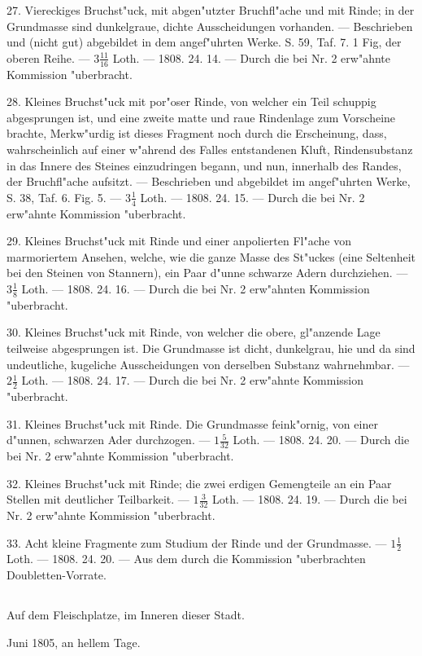 \documentclass[a4paper, 11pt, oneside, polutonikogreek, german]{article}
\begin{document}
27. Viereckiges Bruchst"uck, mit abgen"utzter Bruchfl"ache und mit Rinde; in der Grundmasse sind dunkelgraue, dichte Ausscheidungen vorhanden. --- Beschrieben und (nicht gut) abgebildet in dem angef"uhrten Werke. S. 59, Taf. 7. 1 Fig, der oberen Reihe. --- $\mathfrak{3\frac{11}{16}}$ Loth. --- 1808. 24. 14. --- Durch die bei Nr. 2 erw"ahnte Kommission "uberbracht.

28. Kleines Bruchst"uck mit por"oser Rinde, von welcher ein Teil schuppig abgesprungen ist, und eine zweite matte und raue Rindenlage zum Vorscheine brachte, Merkw"urdig ist dieses Fragment noch durch die Erscheinung, dass, wahrscheinlich auf einer w"ahrend des Falles entstandenen Kluft, Rindensubstanz in das Innere des Steines einzudringen begann, und nun, innerhalb des Randes, der Bruchfl"ache aufsitzt. --- Beschrieben und abgebildet im angef"uhrten Werke, S. 38, Taf. 6. Fig. 5. --- $\mathfrak{3\frac{1}{4}}$ Loth. --- 1808. 24. 15. --- Durch die bei Nr. 2 erw"ahnte Kommission "uberbracht.

29. Kleines Bruchst"uck mit Rinde und einer anpolierten Fl"ache von marmoriertem Ansehen, welche, wie die ganze Masse des St"uckes (eine Seltenheit bei den Steinen von Stannern), ein Paar d"unne schwarze Adern durchziehen. --- $\mathfrak{3\frac{1}{8}}$ Loth. --- 1808. 24. 16. --- Durch die bei Nr. 2 erw"ahnten Kommission "uberbracht.

30. Kleines Bruchst"uck mit Rinde, von welcher die obere, gl"anzende Lage teilweise abgesprungen ist. Die Grundmasse ist dicht, dunkelgrau, hie und da sind undeutliche, kugeliche Ausscheidungen von derselben Substanz wahrnehmbar. --- $\mathfrak{2\frac{1}{2}}$ Loth. --- 1808. 24. 17. --- Durch die bei Nr. 2 erw"ahnte Kommission "uberbracht.

31. Kleines Bruchst"uck mit Rinde. Die Grundmasse feink"ornig, von einer d"unnen, schwarzen Ader durchzogen. --- $\mathfrak{1\frac{5}{32}}$ Loth. --- 1808. 24. 20. --- Durch die bei Nr. 2 erw"ahnte Kommission "uberbracht.

32. Kleines Bruchst"uck mit Rinde; die zwei erdigen Gemengteile an ein Paar Stellen mit deutlicher Teilbarkeit. --- $\mathfrak{1\frac{3}{32}}$ Loth. --- 1808. 24. 19. --- Durch die bei Nr. 2 erw"ahnte Kommission "uberbracht.

33. Acht kleine Fragmente zum Studium der Rinde und der Grundmasse. --- $\mathfrak{1\frac{1}{2}}$ Loth. --- 1808. 24. 20. --- Aus dem durch die Kommission "uberbrachten Doubletten-Vorrate.
\subsection{}
\begin{center}

Auf dem Fleischplatze, im Inneren dieser Stadt.

Juni 1805, an hellem Tage.
\end{center}
\end{document}
